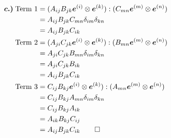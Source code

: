 \begin{align*}
\bm{c.)}\; \text{Term 1} &= (A_{ij} B_{jk} \bm{e}^{(i)} \otimes \bm{e}^{(k)}):(C_{mn} \bm{e}^{(m)} \otimes \bm{e}^{(n)})\\ 
&= A_{ij} B_{jk} C_{mn} \delta_{im} \delta_{kn} \\ 
&= A_{ij} B_{jk} C_{ik} \\ 
\text{Term 2} &= (A_{ji} C_{jk} \bm{e}^{(i)} \otimes \bm{e}^{(k)}) : (B_{mn} \bm{e}^{(m)}  \otimes \bm{e}^{(n)}) \\
&=A_{ji} C_{jk} B_{mn} \delta_{im} \delta_{kn} \\
&= A_{ji} C_{jk} B_{ik} \\
&= A_{ij} B_{jk} C_{ik} \\
\text{Term 3} &= C_{ij} B_{kj} \bm{e}^{(i)} \otimes \bm{e}^{(k)}) : (A_{mn} \bm{e}^{(m)} \otimes \bm{e}^{(n)}) \\
&= C_{ij} B_{kj} A_{mn} \delta_{im} \delta_{kn} \\
&= C_{ij} B_{kj} A_{ik} \\
&= A_{ik} B_{kj} C_{ij} \\
&= A_{ij} B_{jk} C_{ik} \qed \\
\end{align*}

